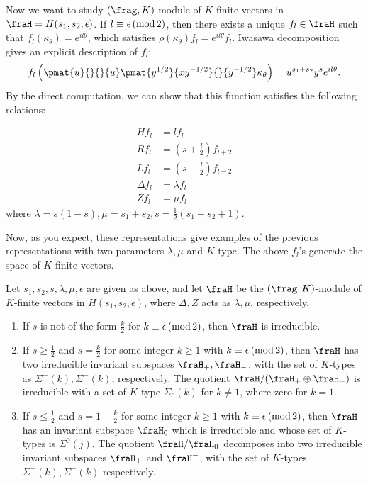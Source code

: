 Now we want to study $(\frag, K)$-module of $K$-finite vectors in $\fraH = H(s_{1}, s_{2}, \epsilon)$. 
If $l\equiv \epsilon\,(\mathrm{mod}\,2)$, then there exists a unique $f_{l}\in \fraH$ such that $f_{l}(\kappa_{\theta}) = e^{il\theta}$, which satisfies $\rho(\kappa_{\theta})f_{l} = e^{il\theta}f_{l}$. 
Iwasawa decomposition gives an explicit description of $f_{l}$: 
$$
f_{l}\left( \pmat{u}{}{}{u} \pmat{y^{1/2}}{xy^{-1/2}}{}{y^{-1/2}} \kappa_{\theta}\right) = u^{s_{1} + s_{2}} y^{s} e^{il\theta}.
$$
By the direct computation, we can show that this function satisfies the following relations:
\begin{proposition}
\begin{align*}
Hf_{l} &= lf_{l} \\
Rf_{l} &= \left( s + \frac{l}{2}\right) f_{l+2} \\
Lf_{l} &= \left( s - \frac{l}{2}\right) f_{l-2} \\
\Delta f_{l} &= \lambda f_{l} \\
Zf_{l} &= \mu f_{l}
\end{align*}
where $\lambda = s(1-s), \mu = s_{1} + s_{2}, s = \frac{1}{2}(s_{1} - s_{2} +1)$. 
\end{proposition}
Now, as you expect, these representations give examples of the previous representations with two parameters $\lambda, \mu$ and $K$-type. 
The above $f_{l}$'s generate the space of $K$-finite vectors. 
\begin{theorem}
Let $s_{1}, s_{2}, s, \lambda, \mu, \epsilon$ are given as above, and let $\fraH$ be the $(\frag, K)$-module of $K$-finite vectors in $H(s_{1}, s_{2}, \epsilon)$, where $\Delta, Z$ acts as $\lambda, \mu$, respectively. 
\begin{enumerate}
\item If $s$ is not of the form $\frac{k}{2}$ for $k\equiv \epsilon\,(\mathrm{mod}\,2)$, then $\fraH$ is irreducible. 
\item If $s\geq \frac{1}{2}$ and $s = \frac{k}{2}$ for some integer $k\geq 1$ with $k\equiv \epsilon\,(\mathrm{mod}\,2)$, then $\fraH$ has two irreducible invariant subspaces $\fraH_{+}, \fraH_{-}$, with the set of $K$-types as $\Sigma^{+}(k), \Sigma^{-}(k)$, respectively. The quotient $\fraH/(\fraH_{+}\oplus \fraH_{-})$ is irreducible with a set of $K$-type $\Sigma_{0}(k)$ for $k\neq 1$, where zero for $k=1$. 
\item If $s\leq \frac{1}{2}$ and $s = 1-\frac{k}{2}$ for some integer $k\geq 1$ with $k\equiv \epsilon\,(\mathrm{mod}\,2)$, then $\fraH$ has an invariant subspace $\fraH_{0}$ which is irreducible and whose set of $K$-types is $\Sigma^{0}(j)$. 
The quotient $\fraH/\fraH_{0}$ decomposes into two irreducible invariant subspaces $\fraH_{+}$ and $\fraH^{-}$, with the set of $K$-types $\Sigma^{+}(k), \Sigma^{-}(k)$ respectively. 
\end{enumerate}
\end{theorem}
